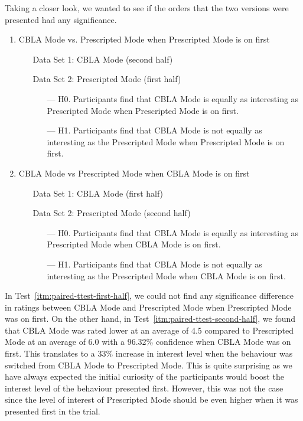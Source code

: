 Taking a closer look, we wanted to see if the orders that the two versions were presented had any significance. 

\begin{enumerate}[resume]
	\item CBLA Mode vs. Prescripted Mode when Prescripted Mode is on first
	\begin{itemize}[align=left]\label{itm:paired-ttest-first-half}
		\item[Data Set 1: ] CBLA Mode (second half)
		\item[Data Set 2: ] Prescripted Mode (first half)
		\begin{itemize}
			\item[--- H0.] Participants find that CBLA Mode is equally as interesting as Prescripted Mode when Prescripted Mode is on first.
			\item[--- H1.] Participants find that CBLA Mode is not equally as interesting as the Prescripted Mode when Prescripted Mode is on first.
		\end{itemize}
	\end{itemize}
	\item CBLA Mode vs Prescripted Mode when CBLA Mode is on first
	\begin{itemize}[align=left]\label{itm:paired-ttest-second-half}
		\item[Data Set 1: ]  CBLA Mode (first half) 
		\item[Data Set 2: ]  Prescripted Mode (second half) 
		\begin{itemize}
			\item[--- H0.] Participants find that CBLA Mode is equally as interesting as Prescripted Mode when CBLA Mode is on first.
			\item[--- H1.] Participants find that CBLA Mode is not equally as interesting as the Prescripted Mode when CBLA Mode is on first.
		\end{itemize}
	\end{itemize}
\end{enumerate}

In Test~\ref{itm:paired-ttest-first-half}, we could not find any significance difference in ratings between CBLA Mode and Prescripted Mode when Prescripted Mode was on first. On the other hand, in Test~\ref{itm:paired-ttest-second-half}, we found that CBLA Mode was rated lower at an average of 4.5 compared to Prescripted Mode at an average of 6.0 with a 96.32\% confidence when CBLA Mode was on first. This translates to a 33\% increase in interest level when the behaviour was switched from CBLA Mode to Prescripted Mode. This is quite surprising as we have always expected the initial curiosity of the participants would boost the interest level of the behaviour presented first. However, this was not the case since the level of interest of Prescripted Mode should be even higher when it was presented first in the trial.


